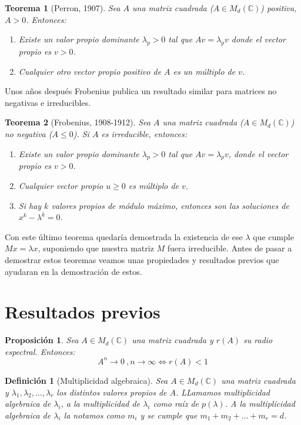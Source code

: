 \documentclass[size=a4, parskip=half, titlepage=false, toc=flat, toc=bib, 12pt]{scrartcl}
\theoremstyle{theorem-style}
\newtheorem{nth}{Teorema}[section]
\newtheorem{nprop}{Proposición}[section]
\theoremstyle{definition-style}
\newtheorem{ndef}{Definición}[section]
\theoremstyle{remark-style}
\theoremstyle{example-style}
\theoremstyle{definition-style}
\theoremstyle{remark-style}
\begin{document}
\begin{nth}[Perron, 1907]
Sea $A$ una matriz cuadrada ($A \in M_d(\mathbb{C})$) positiva, $A > 0$. Entonces:
\begin{enumerate}
\item Existe un valor propio dominante $\lambda_p > 0$ tal que $Av = \lambda_p v$ donde el vector propio es $v > 0$.
\item Cualquier otro vector propio positivo de $A$ es un múltiplo de $v$.
\end{enumerate}
\end{nth}

Unos años después Frobenius publica un resultado similar para matrices no negativas e irreducibles.

\begin{nth}[Frobenius, 1908-1912]
Sea $A $ una matriz cuadrada ($A \in M_d(\mathbb{C})$) no negativa ($A \leq 0$). Si $A$ es irreducible, entonces:
\begin{enumerate}
\item Existe un valor propio dominante $\lambda_p > 0$ tal que $A v = \lambda_p v$, donde el vector propio es
$v > 0$.
\item Cualquier vector propio $u \geq 0$ es múltiplo de $v$.
\item Si hay $k$ valores propios de módulo máximo, entonces son las soluciones de $x^k - \lambda^k = 0$.
\end{enumerate}
\end{nth}

Con este último teorema quedaría demostrada la existencia de ese $\lambda$ que cumple $Mx = \lambda x$, suponiendo que nuestra matriz $M$ fuera irreducible. Antes de pasar a demostrar estos teoremas veamos unas propiedades y resultados previos que ayudaran en la demostración de estos.

\section{Resultados previos}

\begin{nprop}
\label{res1}
Sea $A \in M_d(\mathbb{C})$ una matriz cuadrada y $r(A)$ su radio espectral. Entonces:
$$A^n \rightarrow 0 \ ,  n \rightarrow \infty \Leftrightarrow r(A) < 1 $$
\end{nprop}

\begin{ndef}[Multiplicidad algebraica]
Sea $A \in M_d(\mathbb{C})$ una matriz cuadrada y $\lambda_1, \lambda_2, \dots, \lambda_r$ los distintos valores propios de $A$. LLamamos multiplicidad algebraica de $\lambda_i$, a la multiplicidad de $\lambda_i$ como raíz de $p(\lambda)$. A la multiplicidad algebraica de $\lambda_i$ la notamos como $m_i$ y se cumple que $m_1 + m_2 + \dots + m_r = d$.
\end{ndef}
\end{document}
